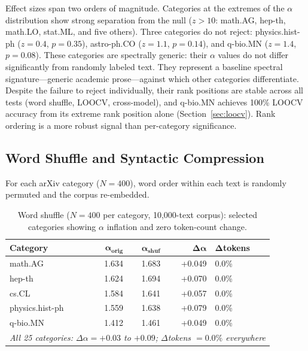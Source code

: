 \documentclass[12pt,letterpaper]{article}
\newcommand{\al}{\alpha}
\newcommand{\dalpha}{\Delta\alpha}
\begin{document}
Effect sizes span two orders of magnitude.  Categories at the
extremes of the $\al$ distribution show strong separation from
the null ($z > 10$: math.AG, hep-th, math.LO, stat.ML, and five
others).  Three categories do not reject: physics.hist-ph
($z = 0.4$, $p = 0.35$), astro-ph.CO ($z = 1.1$, $p = 0.14$),
and q-bio.MN ($z = 1.4$, $p = 0.08$).  These categories are spectrally generic: their $\al$ values do not
differ significantly from randomly labeled text.  They represent a
baseline spectral signature---generic academic prose---against which
other categories differentiate.  Despite the failure to reject
individually, their rank positions are stable across all tests
(word shuffle, LOOCV, cross-model), and q-bio.MN achieves 100\%
LOOCV accuracy from its extreme rank position alone
(Section~\ref{sec:loocv}).  Rank ordering is a more robust signal
than per-category significance.

\subsection{Word Shuffle and Syntactic Compression}
\label{sec:shuffle}

For each arXiv category ($N = 400$), word order within each text is
randomly permuted and the corpus re-embedded.

\begin{table}[H]
\centering
\caption{Word shuffle ($N = 400$ per category, 10{,}000-text corpus):
selected categories showing $\al$ inflation and zero token-count
change.}
\label{tab:shuffle}
\begin{tabular}{lrrrl}
\toprule
\textbf{Category} & $\boldsymbol{\al_{\text{orig}}}$ &
$\boldsymbol{\al_{\text{shuf}}}$ & $\boldsymbol{\dalpha}$ &
$\boldsymbol{\Delta}$\textbf{tokens} \\
\midrule
math.AG & 1.634 & 1.683 & +0.049 & 0.0\% \\
hep-th & 1.624 & 1.694 & +0.070 & 0.0\% \\
cs.CL & 1.584 & 1.641 & +0.057 & 0.0\% \\
physics.hist-ph & 1.559 & 1.638 & +0.079 & 0.0\% \\
q-bio.MN & 1.412 & 1.461 & +0.049 & 0.0\% \\
\midrule
\multicolumn{5}{l}{\textit{All 25 categories: $\dalpha = +0.03$ to
$+0.09$; $\Delta$tokens $= 0.0\%$ everywhere}} \\
\bottomrule
\end{tabular}
\end{table}
\end{document}
